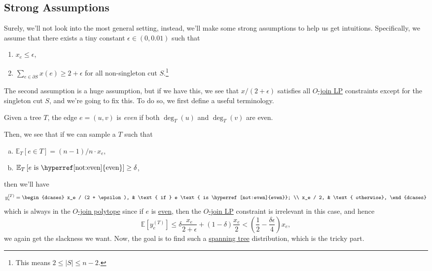 \subsection{Strong Assumptions}\label{sub:strong-assumption}
Surely, we'll not look into the most general setting, instead, we'll make some strong assumptions to help us get intuitions. Specifically, we assume that there exists a tiny constant \(\epsilon \in (0, 0.01)\) such that
\begin{enumerate}
	\item \(x_e \leq \epsilon \),
	\item \(\sum_{e\in \partial S} x(e) \geq 2 + \epsilon \) for all non-singleton cut \(S\).\footnote{This means \(2 \leq \left\vert S \right\vert \leq n-2\).}
\end{enumerate}
The second assumption is a huge assumption, but if we have this, we see that \(x / (2 + \epsilon )\) satisfies all \hyperref[eq:O-join-LP]{\(O\)-join LP} constraints except for the singleton cut \(S\), and we're going to fix this. To do so, we first define a useful terminology.

\begin{notation}[Even]\label{not:even}
	Given a tree \(T\), the edge \(e=(u, v)\) is \emph{even} if both \(\deg_T(u)\) and \(\deg_T(v)\) are even.
\end{notation}

Then, we see that if we can sample a \(T\) such that
\begin{enumerate}[(a)]
	\item \(\mathbb{E}_{T}\left[e\in T \right] = (n-1) / n \cdot x_e\),
	\item \(\mathbb{E}_{T}\left[e \text{ is \hyperref[not:even]{even}} \right] \geq \delta \),
\end{enumerate}
then we'll have
\[
	y^{(T)}_e = \begin{dcases}
		x_e / (2 + \epsilon), & \text{ if } e \text{ is \hyperref[not:even]{even}}; \\
		x_e / 2,              & \text{ otherwise},
	\end{dcases}
\]
which is always in the \hyperref[eq:O-join-LP]{\(O\)-join polytope} since if \(e\) is \hyperref[not:even]{even}, then the \hyperref[eq:O-join-LP]{\(O\)-join LP} constraint is irrelevant in this case, and hence
\[
	\mathbb{E}\left[y_e^{(T)} \right] \leq \delta \frac{x_e}{2+\epsilon } + (1 - \delta ) \frac{x_e}{2} < \left( \frac{1}{2} - \frac{\delta \epsilon }{4} \right) x_e,
\]
we again get the slackness we want. Now, the goal is to find such a \hyperref[def:spanning-tree]{spanning tree} distribution, which is the tricky part.

